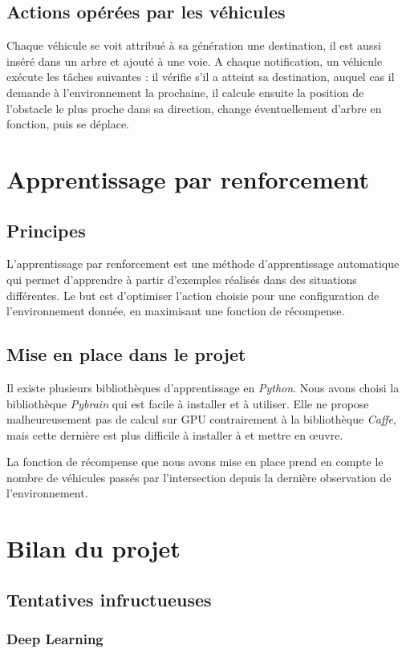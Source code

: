 \documentclass[11pt]{article}
\begin{document}
\subsection{Actions opérées par les véhicules}
Chaque véhicule se voit attribué à sa génération une destination, il est aussi inséré dans un arbre et ajouté à une voie. A chaque notification, un véhicule exécute les tâches suivantes : il vérifie s'il a atteint sa destination, auquel cas il demande à l'environnement la prochaine, il calcule ensuite la position de l'obstacle le plus proche dans sa direction, change éventuellement d'arbre en fonction, puis se déplace. 

\section{Apprentissage par renforcement}
\subsection{Principes}
L'apprentissage par renforcement est une méthode d'apprentissage automatique qui permet d'apprendre à partir d'exemples réalisés dans des situations différentes. Le but est d'optimiser l'action choisie pour une configuration de l'environnement donnée, en maximisant une fonction de récompense.

\subsection{Mise en place dans le projet}
Il existe plusieurs bibliothèques d'apprentissage en \emph{Python}. Nous avons choisi la bibliothèque \emph{Pybrain} qui est facile à installer et à utiliser. Elle ne propose malheureusement pas de calcul sur GPU contrairement à la bibliothèque \emph{Caffe}, mais cette dernière est plus difficile à installer à et mettre en \oe uvre. 

La fonction de récompense que nous avons mise en place prend en compte le nombre de véhicules passés par l'intersection depuis la dernière observation de l'environnement.

\section{Bilan du projet}
\subsection{Tentatives infructueuses}
\subsubsection{Deep Learning}
\end{document}
